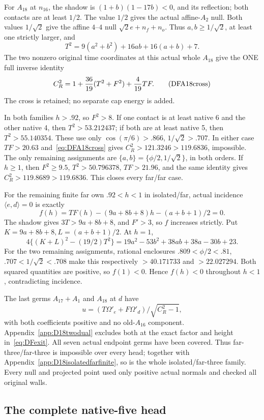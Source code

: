 \documentclass[11pt]{article}
\theoremstyle{definition}
\theoremstyle{remark}
\newcommand{\ip}[2]{\langle #1,#2\rangle}
\begin{document}
For \(A_{18}\) at \(n_{16}\), the shadow is
\((1+b)(1-17b)<0\), and its reflection; both contacts are
at least \(1/2\).
The value \(1/2\) gives the actual affine-\(A_2\) null.
Both values \(1/\sqrt2\) give the affine \(4\)--\(4\) null
\(\sqrt2e+n_f+n_o\).
Thus \(a,b\ge1/\sqrt2\), at least one strictly larger, and
\[
 T^2=9(a^2+b^2)+16ab+16(a+b)+7.
\]
The two nonzero original time coordinates at this actual
whole \(A_{18}\) give the ONE full inverse identity
\[
 C_R^2=1+{36\over19}(T^2+F^2)+{4\over19}TF .
\tag{DFA18cross}\label{eq:DFA18cross}
\]
The cross is retained; no separate cap energy is added.

In both families \(h>.92\), so \(F^2>8\).
If one contact is at least native 6 and the other native 4,
then \(T^2>53.212437\); if both are at least native 5,
then \(T^2>55.140354\).
These use only \(\cos(\pi/6)>.866\), \(1/\sqrt2>.707\).
In either case \(TF>20.63\) and~\eqref{eq:DFA18cross}
gives \(C_R^2>121.3246>119.6836\), impossible.
The only remaining assignments are
\(\{a,b\}=\{\phi/2,1/\sqrt2\}\), in both orders.
If \(h\ge1\), then \(F^2\ge9.5\), \(T^2>50.796378\),
\(TF>21.96\), and the same identity gives
\(C_R^2>119.8689>119.6836\).
This closes every far/far case.

For the remaining finite far own \(.92<h<1\) in isolated/far,
actual incidence \(\ip ed=0\) is exactly
\[
 f(h)=TF(h)-(9a+8b+8)h-(a+b+1)/2=0.
\]
The shadow gives \(3T>9a+8b+8\), and \(F'>3\), so \(f\)
increases strictly.
Put \(K=9a+8b+8,L=(a+b+1)/2\).
At \(h=1\),
\[
 4\{(K+L)^2-(19/2)T^2\}
   =19a^2-53b^2+38ab+38a-30b+23.
\]
For the two remaining assignments, rational enclosures
\(.809<\phi/2<.81\), \(.707<1/\sqrt2<.708\) make this
respectively \(>40.171733\) and \(>22.027294\).
Both squared quantities are positive, so \(f(1)<0\).
Hence \(f(h)<0\) throughout \(h<1\), contradicting incidence.

The last germs \(A_{17}+A_1\) and \(A_{18}\) at \(d\) have
\[
 u=(T\Omega'_e+F\Omega'_d)/\sqrt{C_R^2-1},
\]
with both coefficients positive and no old-\(A_{16}\) component.
Appendix~\ref{app:D18twodual} excludes both at the exact
factor and height in~\eqref{eq:DFexit}.
All seven actual endpoint germs have been covered.
Thus far-three/far-three is impossible over every head;
together with Appendix~\ref{app:D18isolatedfarfinite},
so is the whole isolated/far-three family.
Every null and projected point used only positive actual normals
and checked all original walls.

\subsection{The complete native-five head}
\label{app:D18nativefive}
\end{document}

